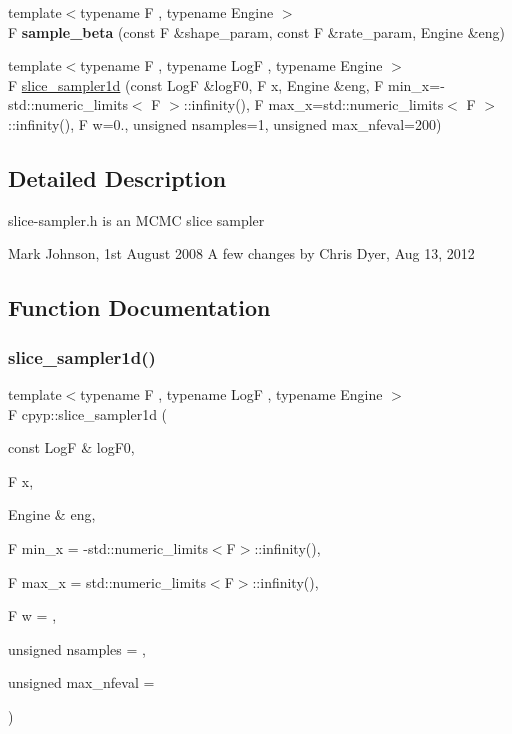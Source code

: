 \begin{DoxyCompactItemize}
\item 
\mbox{\label{namespacecpyp_ad04d908c477858b8bc9f3e08a7d653d7}} 
{\footnotesize template$<$typename F , typename Engine $>$ }\\F {\bfseries sample\+\_\+beta} (const F \&shape\+\_\+param, const F \&rate\+\_\+param, Engine \&eng)
\item 
{\footnotesize template$<$typename F , typename LogF , typename Engine $>$ }\\F \mbox{\hyperlink{namespacecpyp_af065740dc4e74b304617c3bd6b03990a}{slice\+\_\+sampler1d}} (const LogF \&log\+F0, F x, Engine \&eng, F min\+\_\+x=-\/std\+::numeric\+\_\+limits$<$ F $>$\+::infinity(), F max\+\_\+x=std\+::numeric\+\_\+limits$<$ F $>$\+::infinity(), F w=0., unsigned nsamples=1, unsigned max\+\_\+nfeval=200)
\end{DoxyCompactItemize}


\subsection{Detailed Description}
slice-\/sampler.\+h is an M\+C\+MC slice sampler

Mark Johnson, 1st August 2008 A few changes by Chris Dyer, Aug 13, 2012 

\subsection{Function Documentation}
\mbox{\label{namespacecpyp_af065740dc4e74b304617c3bd6b03990a}} 
\subsubsection{\texorpdfstring{slice\+\_\+sampler1d()}{slice\_sampler1d()}}
{\footnotesize\ttfamily template$<$typename F , typename LogF , typename Engine $>$ \\
F cpyp\+::slice\+\_\+sampler1d (\begin{DoxyParamCaption}\item[{const LogF \&}]{log\+F0,  }\item[{F}]{x,  }\item[{Engine \&}]{eng,  }\item[{F}]{min\+\_\+x = {\ttfamily -\/std\+:\+:numeric\+\_\+limits$<$F$>$\+:\+:infinity()},  }\item[{F}]{max\+\_\+x = {\ttfamily std\+:\+:numeric\+\_\+limits$<$F$>$\+:\+:infinity()},  }\item[{F}]{w = {},  }\item[{unsigned}]{nsamples = {},  }\item[{unsigned}]{max\+\_\+nfeval = {} }\end{DoxyParamCaption})}


